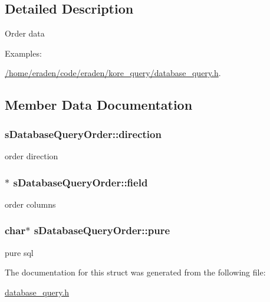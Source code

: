 \subsection{Detailed Description}
Order data \begin{Desc}
\item[Examples\+: ]\par
\hyperlink{_2home_2eraden_2code_2eraden_2kore_query_2database_query_8h-example}{/home/eraden/code/eraden/kore\+\_\+query/database\+\_\+query.\+h}.\end{Desc}


\subsection{Member Data Documentation}
\subsubsection[{\texorpdfstring{direction}{direction}}]{ s\+Database\+Query\+Order\+::direction}\hypertarget{structsDatabaseQueryOrder_a78ffc2b3348fa8f50949885229de3cad}{}\label{structsDatabaseQueryOrder_a78ffc2b3348fa8f50949885229de3cad}
order direction 
\subsubsection[{\texorpdfstring{field}{field}}]{$\ast$ s\+Database\+Query\+Order\+::field}\hypertarget{structsDatabaseQueryOrder_a4cfafb9043648c011721411cabb1fc22}{}\label{structsDatabaseQueryOrder_a4cfafb9043648c011721411cabb1fc22}
order columns 
\subsubsection[{\texorpdfstring{pure}{pure}}]{\setlength{\rightskip}{0pt plus 5cm}char$\ast$ s\+Database\+Query\+Order\+::pure}\hypertarget{structsDatabaseQueryOrder_ac2b2660647eddc285042a724d03b2476}{}\label{structsDatabaseQueryOrder_ac2b2660647eddc285042a724d03b2476}
pure sql 

The documentation for this struct was generated from the following file\+:\begin{DoxyCompactItemize}
\item 
\hyperlink{database__query_8h}{database\+\_\+query.\+h}\end{DoxyCompactItemize}
